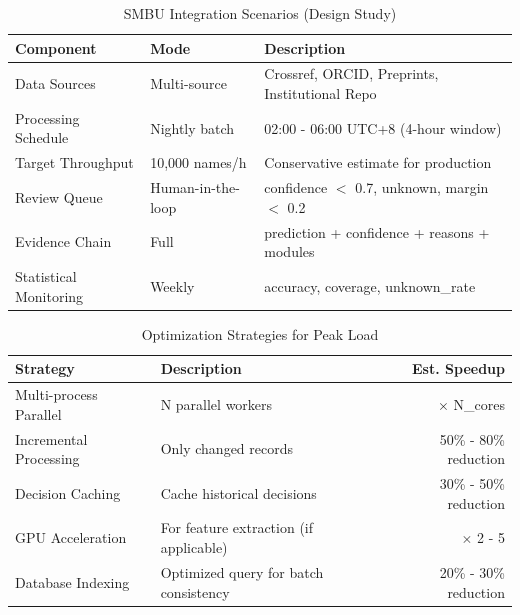 \begin{table}[htbp]
\centering
\caption{SMBU Integration Scenarios (Design Study)}
\label{tab:smbu_scenarios}
\begin{tabular}{llp{6cm}}
\toprule
Component & Mode & Description \\
\midrule
Data Sources & Multi-source & Crossref, ORCID, Preprints, Institutional Repo \\
Processing Schedule & Nightly batch & 02:00 - 06:00 UTC+8 (4-hour window) \\
Target Throughput & 10,000 names/h & Conservative estimate for production \\
Review Queue & Human-in-the-loop & confidence $<$ 0.7, unknown, margin $<$ 0.2 \\
Evidence Chain & Full & prediction + confidence + reasons + modules \\
Statistical Monitoring & Weekly & accuracy, coverage, unknown\_rate \\
\bottomrule
\end{tabular}
\end{table}

\begin{table}[htbp]
\centering
\caption{Optimization Strategies for Peak Load}
\label{tab:smbu_optimization}
\begin{tabular}{lp{5cm}r}
\toprule
Strategy & Description & Est. Speedup \\
\midrule
Multi-process Parallel & N parallel workers & $\times$ N\_cores \\
Incremental Processing & Only changed records & 50\% - 80\% reduction \\
Decision Caching & Cache historical decisions & 30\% - 50\% reduction \\
GPU Acceleration & For feature extraction (if applicable) & $\times$ 2 - 5 \\
Database Indexing & Optimized query for batch consistency & 20\% - 30\% reduction \\
\bottomrule
\end{tabular}
\end{table}

%
%
%
%
